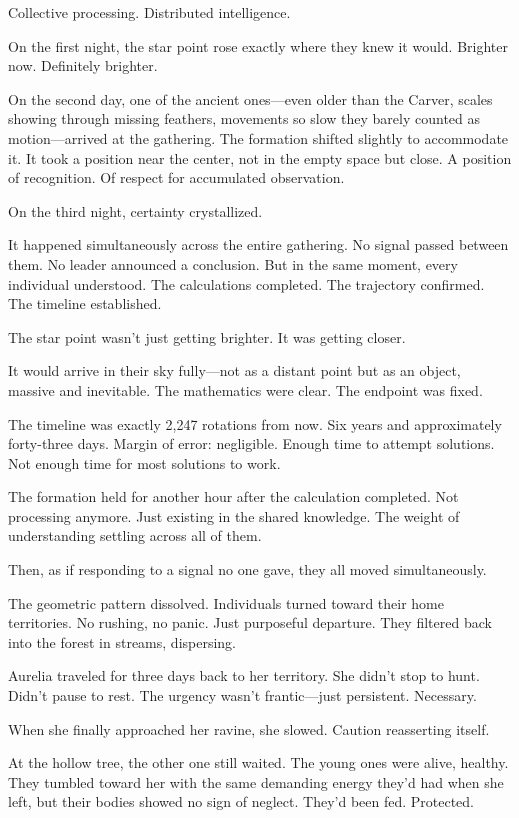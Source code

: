 Collective processing. Distributed intelligence.

On the first night, the star point rose exactly where they knew it would. Brighter now. Definitely brighter.

On the second day, one of the ancient ones—even older than the Carver, scales showing through missing feathers, movements so slow they barely counted as motion—arrived at the gathering. The formation shifted slightly to accommodate it. It took a position near the center, not in the empty space but close. A position of recognition. Of respect for accumulated observation.

On the third night, certainty crystallized.

It happened simultaneously across the entire gathering. No signal passed between them. No leader announced a conclusion. But in the same moment, every individual understood. The calculations completed. The trajectory confirmed. The timeline established.

The star point wasn't just getting brighter. It was getting closer.

It would arrive in their sky fully—not as a distant point but as an object, massive and inevitable. The mathematics were clear. The endpoint was fixed.

The timeline was exactly 2,247 rotations from now. Six years and approximately forty-three days. Margin of error: negligible. Enough time to attempt solutions. Not enough time for most solutions to work.

The formation held for another hour after the calculation completed. Not processing anymore. Just existing in the shared knowledge. The weight of understanding settling across all of them.

Then, as if responding to a signal no one gave, they all moved simultaneously.

The geometric pattern dissolved. Individuals turned toward their home territories. No rushing, no panic. Just purposeful departure. They filtered back into the forest in streams, dispersing.

Aurelia traveled for three days back to her territory. She didn't stop to hunt. Didn't pause to rest. The urgency wasn't frantic—just persistent. Necessary.

When she finally approached her ravine, she slowed. Caution reasserting itself.

At the hollow tree, the other one still waited. The young ones were alive, healthy. They tumbled toward her with the same demanding energy they'd had when she left, but their bodies showed no sign of neglect. They'd been fed. Protected.

